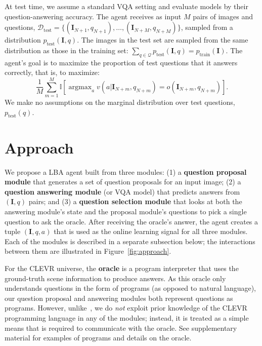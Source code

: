 \documentclass[10pt,twocolumn,letterpaper]{article}
\DeclareMathOperator*{\argmax}{argmax}
\newcommand{\image}{\mathbf{I}}
\newcommand{\imageQpair}{(\mathbf{I}, q)}
\newcommand{\imageQApair}{(\mathbf{I}, q, a)}
\newcommand{\testset}{\mathcal{D}_\mathrm{test}}
\begin{document}
At test time, we assume a standard VQA setting and evaluate models by their question-answering accuracy. The agent receives as input $M$ pairs of images and questions, $\testset \!=\! \{(\image_{N+1}, q_{N+1}), \dots, (\image_{N+M}, q_{N+M})\}$, sampled from a distribution $p_\mathrm{test}\imageQpair$. The images in the test set are sampled from the same distribution as those in the training set: $\sum_{q \in \mathcal{Q}} p_\mathrm{test}\imageQpair \!=\! p_\mathrm{train}(\image)$. The agent's goal is to maximize the proportion of test questions that it answers correctly, that is, to maximize:
\begin{equation}
\frac{1}{M} \sum_{m=1}^M \mathbb{I}[\argmax_a v(a | \image_{N+m}, q_{N+m}) = o(\image_{N+m}, q_{N+m})].\nonumber
\end{equation}
We make no assumptions on the marginal distribution over test questions, $p_\mathrm{test}(q)$.



\section{Approach}
\vspace{-0.05in}

We propose a LBA agent built from three modules: (1) a \textbf{question proposal module} that generates a set of question proposals for an input image; (2) a \textbf{question answering module} (or VQA model) that predicts answers from $\imageQpair$ pairs;
and (3) a \textbf{question selection module} that looks at both the answering module's state and the proposal module's questions to pick a single question to ask the oracle.
After receiving the oracle's answer, the agent creates a tuple $\imageQApair$ that is used as the online learning signal for all three modules. Each of the modules is described in a separate subsection below; the interactions between them are illustrated in Figure~\ref{fig:approach}.

For the CLEVR universe, the \textbf{oracle} is a program interpreter that uses the ground-truth scene information to produce answers. As this oracle only understands questions in the form of programs (as opposed to natural language), our question proposal and answering modules both represent questions as programs. However, unlike~\cite{johnson17module,hu17learning}, we do \emph{not} exploit prior knowledge of the CLEVR programming language in any of the modules; instead, it is treated as a simple means that is required to communicate with the oracle. See supplementary material for examples of programs and details on the oracle.
\end{document}
